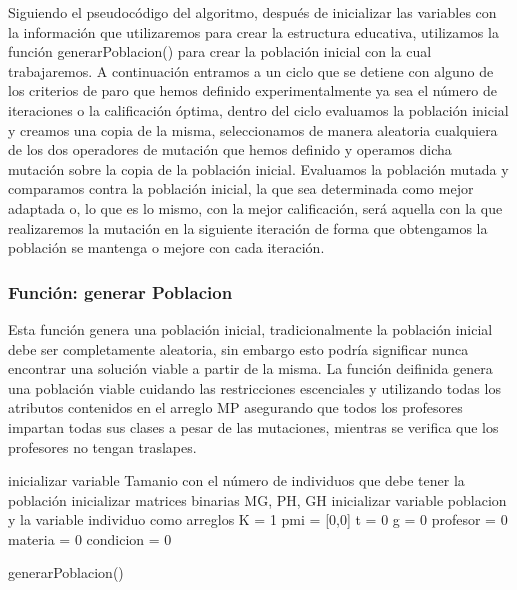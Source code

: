 Siguiendo el pseudocódigo del algoritmo, después de inicializar las variables con la información que utilizaremos para crear la estructura educativa, utilizamos la función generarPoblacion() para crear la población inicial con la cual trabajaremos. A continuación entramos a un ciclo que se detiene con alguno de los criterios de paro que hemos definido experimentalmente ya sea el número de iteraciones o la calificación óptima, dentro del ciclo evaluamos la población inicial y creamos una copia de la misma, seleccionamos de manera aleatoria cualquiera de los dos operadores de mutación que hemos definido y operamos dicha mutación sobre la copia de la población inicial. Evaluamos la población mutada y comparamos contra la población inicial, la que sea determinada como mejor adaptada o, lo que es lo mismo, con la mejor calificación, será aquella con la que realizaremos la mutación en la siguiente iteración de forma que obtengamos la población se mantenga o mejore con cada iteración.

\subsubsection{Funci\'on: generar Poblacion}

Esta función genera una población inicial, tradicionalmente la población inicial debe ser completamente aleatoria, sin embargo esto podría significar nunca encontrar una solución viable a partir de la misma. La función deifinida genera una población viable cuidando las restricciones escenciales y utilizando todas los atributos contenidos en el arreglo MP asegurando que todos los profesores impartan todas sus clases a pesar de las mutaciones, mientras se verifica que los profesores no tengan traslapes.

\begin{algorithm}[H]
	\DontPrintSemicolon
	\SetAlgoLined
	inicializar variable Tamanio con el n\'umero de individuos que debe tener la poblaci\'on\;
	inicializar matrices binarias MG, PH, GH\;
	inicializar variable poblacion y la variable individuo como arreglos\;
	K = 1\;
	pmi = [0,0] \;
	t = 0\;
	g = 0\;
	profesor = 0\;
	materia = 0\;
	condicion = 0\;
	
	\caption{generarPoblacion()}
\end{algorithm}

